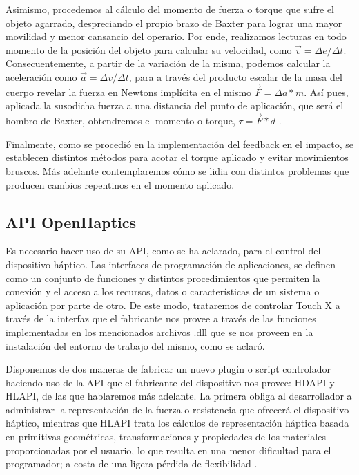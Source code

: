 Asimismo, procedemos al cálculo del momento de fuerza o torque que sufre el objeto agarrado, despreciando el propio brazo de Baxter para lograr una mayor movilidad y menor cansancio del operario. Por ende, realizamos lecturas en todo momento de la posición del objeto para calcular su velocidad, como $\overrightarrow v =\Delta e/  \Delta t$. Consecuentemente, a partir de la variación de la misma, podemos calcular la aceleración como $ \overrightarrow a = \Delta v/ \Delta t$, para a través del producto escalar de la masa del cuerpo revelar la fuerza en Newtons implícita en el mismo $\overrightarrow F = \Delta a  * m$. Así pues, aplicada la susodicha fuerza a una distancia del punto de aplicación, que será el hombro de Baxter, obtendremos el momento o torque, $\tau = \overrightarrow F*d$ \cite{76}.

Finalmente, como se procedió en la implementación del feedback en el impacto, se establecen distintos métodos para acotar el torque aplicado y evitar movimientos bruscos. Más adelante contemplaremos cómo se lidia con distintos problemas que producen cambios repentinos en el momento aplicado. 

\subsection{API OpenHaptics}
Es necesario hacer uso de su API, como se ha aclarado, para el control del dispositivo háptico. Las interfaces de programación de aplicaciones, se definen como un conjunto de funciones y distintos procedimientos que permiten la conexión y el acceso a los recursos, datos o características de un sistema o aplicación por parte de otro. De este modo, trataremos de controlar Touch X a través de la interfaz que el fabricante nos provee a través de las funciones implementadas en los mencionados archivos .dll que se nos proveen en la instalación del entorno de trabajo del mismo, como se aclaró.

Disponemos de dos maneras de fabricar un nuevo plugin o script controlador haciendo uso de la API que el fabricante del dispositivo nos provee: HDAPI y HLAPI, de las que hablaremos más adelante. La primera obliga al desarrollador a administrar la representación de la fuerza o resistencia que ofrecerá el dispositivo háptico, mientras que HLAPI trata los cálculos de representación háptica basada en primitivas geométricas, transformaciones y propiedades de los materiales proporcionadas por el usuario, lo que resulta en una menor dificultad para el programador; a costa de una ligera pérdida de flexibilidad \cite{77}.

